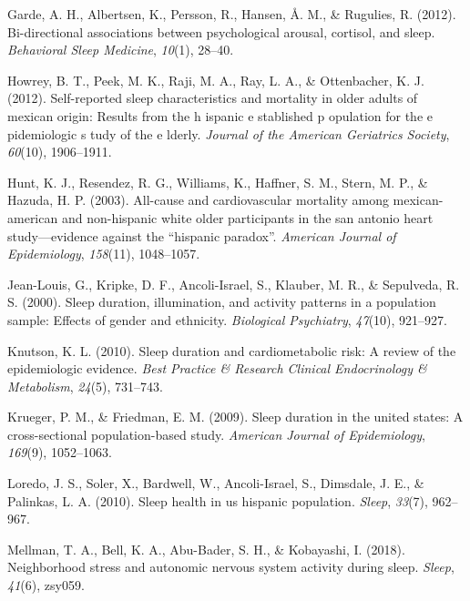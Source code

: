 \documentclass[man, fleqn, noextraspace]{apa6}
\begin{document}
\leavevmode\hypertarget{ref-garde_2012_bi}{}%
Garde, A. H., Albertsen, K., Persson, R., Hansen, Å. M., \& Rugulies, R. (2012). Bi-directional associations between psychological arousal, cortisol, and sleep. \emph{Behavioral Sleep Medicine}, \emph{10}(1), 28--40.

\leavevmode\hypertarget{ref-howrey2012self}{}%
Howrey, B. T., Peek, M. K., Raji, M. A., Ray, L. A., \& Ottenbacher, K. J. (2012). Self-reported sleep characteristics and mortality in older adults of mexican origin: Results from the h ispanic e stablished p opulation for the e pidemiologic s tudy of the e lderly. \emph{Journal of the American Geriatrics Society}, \emph{60}(10), 1906--1911.

\leavevmode\hypertarget{ref-hunt2003all}{}%
Hunt, K. J., Resendez, R. G., Williams, K., Haffner, S. M., Stern, M. P., \& Hazuda, H. P. (2003). All-cause and cardiovascular mortality among mexican-american and non-hispanic white older participants in the san antonio heart study---evidence against the ``hispanic paradox''. \emph{American Journal of Epidemiology}, \emph{158}(11), 1048--1057.

\leavevmode\hypertarget{ref-jean2000sleep}{}%
Jean-Louis, G., Kripke, D. F., Ancoli-Israel, S., Klauber, M. R., \& Sepulveda, R. S. (2000). Sleep duration, illumination, and activity patterns in a population sample: Effects of gender and ethnicity. \emph{Biological Psychiatry}, \emph{47}(10), 921--927.

\leavevmode\hypertarget{ref-knutson2010sleep}{}%
Knutson, K. L. (2010). Sleep duration and cardiometabolic risk: A review of the epidemiologic evidence. \emph{Best Practice \& Research Clinical Endocrinology \& Metabolism}, \emph{24}(5), 731--743.

\leavevmode\hypertarget{ref-krueger2009sleep}{}%
Krueger, P. M., \& Friedman, E. M. (2009). Sleep duration in the united states: A cross-sectional population-based study. \emph{American Journal of Epidemiology}, \emph{169}(9), 1052--1063.

\leavevmode\hypertarget{ref-loredo2010sleep}{}%
Loredo, J. S., Soler, X., Bardwell, W., Ancoli-Israel, S., Dimsdale, J. E., \& Palinkas, L. A. (2010). Sleep health in us hispanic population. \emph{Sleep}, \emph{33}(7), 962--967.

\leavevmode\hypertarget{ref-mellman_2018_SNS}{}%
Mellman, T. A., Bell, K. A., Abu-Bader, S. H., \& Kobayashi, I. (2018). Neighborhood stress and autonomic nervous system activity during sleep. \emph{Sleep}, \emph{41}(6), zsy059.
\end{document}
